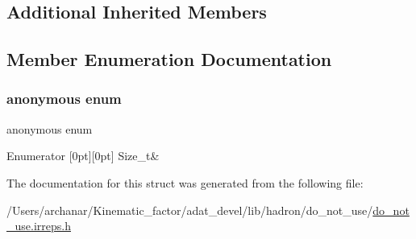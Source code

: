 \subsection*{Additional Inherited Members}


\subsection{Member Enumeration Documentation}
\mbox{\label{structHadron_1_1NonZeroHelicityRep_abc40c6d13da7a2f80fe443e54059ca9b}} 
\subsubsection{\texorpdfstring{anonymous enum}{anonymous enum}}
{\footnotesize\ttfamily anonymous enum}

\begin{DoxyEnumFields}{Enumerator}
[0pt][0pt]{}\mbox{\label{structHadron_1_1NonZeroHelicityRep_abc40c6d13da7a2f80fe443e54059ca9bab71456ca298f731d9f22287daee1e8db}} 
Size\+\_\+t&\\
\hline

\end{DoxyEnumFields}


The documentation for this struct was generated from the following file\+:\begin{DoxyCompactItemize}
\item 
/\+Users/archanar/\+Kinematic\+\_\+factor/adat\+\_\+devel/lib/hadron/do\+\_\+not\+\_\+use/\mbox{\hyperlink{do__not__use_8irreps_8h}{do\+\_\+not\+\_\+use.\+irreps.\+h}}\end{DoxyCompactItemize}
